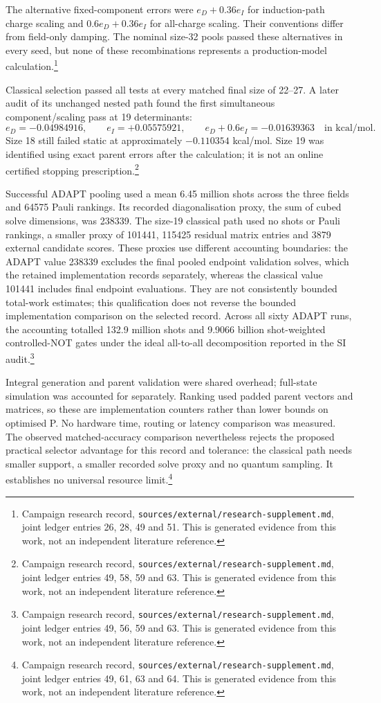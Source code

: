 \documentclass{article}
\newcommand{\record}[1]{\footnote{Campaign research record, \texttt{sources/external/research-supplement.md}, #1. This is generated evidence from this work, not an independent literature reference.}}
\begin{document}
The alternative fixed-component errors were \(e_D+0.36e_I\) for induction-path charge scaling and \(0.6e_D+0.36e_I\) for all-charge scaling. Their conventions differ from field-only damping. The nominal size-32 pools passed these alternatives in every seed, but none of these recombinations represents a production-model calculation.\record{joint ledger entries 26, 28, 49 and 51}

Classical selection passed all tests at every matched final size of 22--27. A later audit of its unchanged nested path found the first simultaneous component/scaling pass at 19 determinants:
\[
 e_D=-0.04984916,\qquad e_I=+0.05575921,\qquad
 e_D+0.6e_I=-0.01639363
 \quad\text{in kcal/mol}.
\]
Size 18 still failed static at approximately \(-0.110354\) kcal/mol. Size 19 was identified using exact parent errors after the calculation; it is not an online certified stopping prescription.\record{joint ledger entries 49, 58, 59 and 63}

Successful ADAPT pooling used a mean 6.45 million shots across the three fields and 64575 Pauli rankings. Its recorded diagonalisation proxy, the sum of cubed solve dimensions, was 238339. The size-19 classical path used no shots or Pauli rankings, a smaller proxy of 101441, 115425 residual matrix entries and 3879 external candidate scores. These proxies use different accounting boundaries: the ADAPT value 238339 excludes the final pooled endpoint validation solves, which the retained implementation records separately, whereas the classical value 101441 includes final endpoint evaluations. They are not consistently bounded total-work estimates; this qualification does not reverse the bounded implementation comparison on the selected record. Across all sixty ADAPT runs, the accounting totalled 132.9 million shots and 9.9066 billion shot-weighted controlled-NOT gates under the ideal all-to-all decomposition reported in the SI audit.\record{joint ledger entries 49, 56, 59 and 63}

Integral generation and parent validation were shared overhead; full-state simulation was accounted for separately. Ranking used padded parent vectors and matrices, so these are implementation counters rather than lower bounds on optimised P. No hardware time, routing or latency comparison was measured. The observed matched-accuracy comparison nevertheless rejects the proposed practical selector advantage for this record and tolerance: the classical path needs smaller support, a smaller recorded solve proxy and no quantum sampling. It establishes no universal resource limit.\record{joint ledger entries 49, 61, 63 and 64}
\end{document}

